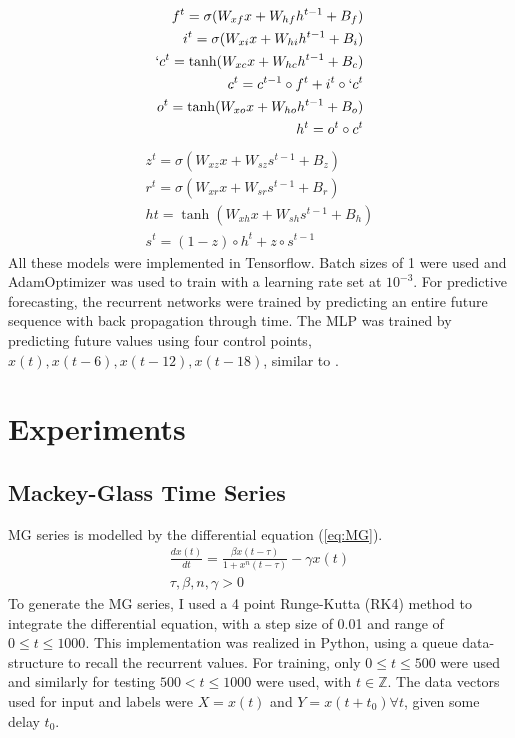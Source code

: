 \documentclass[11pt]{article}
\newcommand{\Z}{\mathbb{Z}}
\begin{document}
\begin{equation}
\begin{split}
f^{t} = \sigma(W_{xf}x + W_{hf}h^{t-1}+B_f) \\
i^{t} = \sigma(W_{xi}x + W_{hi}h^{t-1}+B_i) \\
`c^{t} = \tanh(W_{xc}x+W_{hc}h^{t-1}+B_c) \\
c^{t} = c^{t-1} \circ f^{t} + i^{t} \circ `c^{t} \\
o^{t}= \tanh (W_{xo}x + W_{ho}h^{t-1} + B_o) \\
h^{t} = o^{t} \circ c^{t}  \\
\end{split}
   \label{eq:LSTM_h}
\end{equation}
\begin{equation}
\begin{split}
  z^{t} = \sigma(W_{xz}x + W_{sz}s^{t-1} + B_z) \\
  r^{t} = \sigma(W_{xr}x + W_{sr}s^{t-1} + B_r) \\
  h{t} = \tanh(W_{xh}x + W_{sh}s^{t-1} + B_h) \\
  s^{t} = (1-z) \circ h^{t} + z \circ s^{t-1} 
  \end{split}
  \label{eq:GRU_h}
\end{equation}
All these models were implemented in Tensorflow. Batch sizes of 1 were
used and AdamOptimizer \cite{adam} was used to train with a learning rate set at $10^{-3}$. For predictive forecasting, the recurrent networks
were trained by predicting an entire future sequence with back propagation through
time. The MLP was trained by predicting future values using four
control points, $x(t), x(t-6), x(t-12), x(t-18)$, similar to \cite{tr}.

  \section {Experiments}
\subsection {Mackey-Glass Time Series}
MG series is modelled by the differential equation (\ref{eq:MG}).
\begin{equation}
  \begin{split}
\frac{dx(t)}{dt} = \frac{\beta x(t-\tau)}{1+x^n(t- \tau)} - \gamma x(t)\\
\tau,\beta,n,\gamma > 0
\label{eq:MG}
  \end{split}
\end{equation}
To generate the MG series, I used a 4 point Runge-Kutta (RK4) method to
integrate the differential equation, with a step size of
0.01 and range of $0 \leq t \leq 1000$. This implementation was realized in Python, using a queue
data-structure to recall the recurrent values. For training, only
$0 \leq t \leq 500$ were used and similarly for testing 
$500 < t \leq 1000$  were used, with $t \in \Z$. The data vectors used
for input and labels were $X = x(t) $ and $ Y = x(t+t_0) \forall
t$, given some delay $t_0$. 
\end{document}
